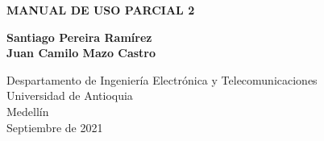 \documentclass{article}
\begin{document}
\begin{titlepage}
    \begin{center}
        \vspace*{1cm}
            
        \Huge
        \textbf{MANUAL DE USO PARCIAL 2}
            
            
        \vspace{1.5cm}
            
        \textbf{Santiago Pereira Ramírez\\
            Juan Camilo Mazo Castro}
            
        \vfill
            
        \vspace{0.8cm}
            
        \Large
        Despartamento de Ingeniería Electrónica y Telecomunicaciones\\
        Universidad de Antioquia\\
        Medellín\\
        Septiembre de 2021
            
    \end{center}
\end{titlepage}
\newpage
\end{document}
